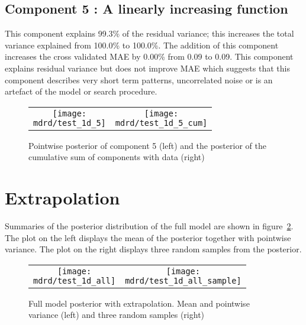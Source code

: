 \documentclass{article} %
\begin{document}
\subsection{Component 5 : A linearly increasing function}



This component explains 99.3\% of the residual variance; this increases the total variance explained from 100.0\% to 100.0\%.
The addition of this component increases the cross validated MAE by 0.00\% from 0.09 to 0.09.
This component explains residual variance but does not improve MAE which suggests that this component describes very short term patterns, uncorrelated noise or is an artefact of the model or search procedure.

\begin{figure}[H]
\newcommand{\wmgd}{0.5\columnwidth}
\newcommand{\hmgd}{3.0cm}
\newcommand{\mdrd}{test_1d}
\newcommand{\mbm}{\hspace{-0.3cm}}
\begin{tabular}{cc}
\mbm \texttt{[image: \\mdrd/test\_1d\_5]} & \texttt{[image: \\mdrd/test\_1d\_5\_cum]}
\end{tabular}
\caption{Pointwise posterior of component 5 (left) and the posterior of the cumulative sum of components with data (right)}
\label{fig:comp5}
\end{figure}

\section{Extrapolation}
\label{sec:extrap}

Summaries of the posterior distribution of the full model are shown in figure~\ref{fig:extrap}.
The plot on the left displays the mean of the posterior together with pointwise variance.
The plot on the right displays three random samples from the posterior.

\begin{figure}[H]
\newcommand{\wmgd}{0.5\columnwidth}
\newcommand{\hmgd}{3.0cm}
\newcommand{\mdrd}{test_1d}
\newcommand{\mbm}{\hspace{-0.3cm}}
\begin{tabular}{cc}
\mbm \texttt{[image: \\mdrd/test\_1d\_all]} & \texttt{[image: \\mdrd/test\_1d\_all\_sample]}
\end{tabular}
\caption{Full model posterior with extrapolation. Mean and pointwise variance (left) and three random samples (right)}
\label{fig:extrap}
\end{figure}
\end{document}
